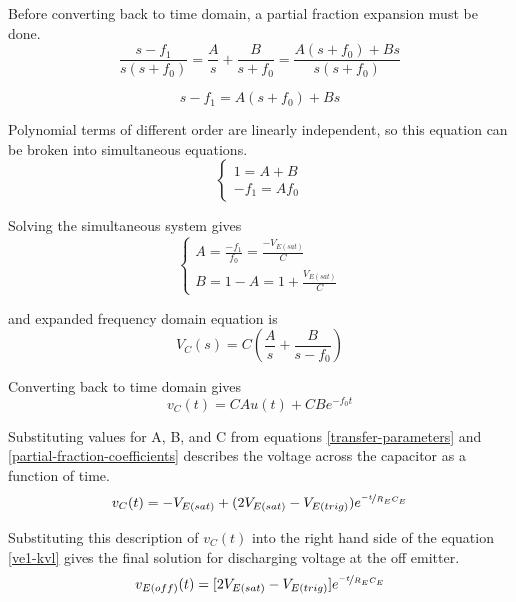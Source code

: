 \documentclass[titlepage, letterpaper, 10.5pt]{article}
\begin{document}
Before converting back to time domain, a partial fraction expansion must be done.
\begin{equation*}
\frac{s-f_{1}}{s(s+f_{0})}=\frac{A}{s}+\frac{B}{s+f_{0}}=\frac{A(s+f_{0})+Bs}{s(s+f_{0})}
\end{equation*}

\begin{equation*}
s-f_{1}=A(s+f_{0})+Bs
\end{equation*}

Polynomial terms of different order are linearly independent, so this equation can be broken
into simultaneous equations.
\begin{equation*}
	\left\{
	\begin{array}{lr}
	1=A+B	\\
	-f_{1}=Af_{0}
	\end{array}
	\right.
\end{equation*}

Solving the simultaneous system gives
\begin{equation}
	\left\{
	\begin{array}{lr}
	A=\frac{-f_{1}}{f_{0}}=\frac{-V_{E(sat)}}{C}	\\
	B=1-A=1+\frac{V_{E(sat)}}{C}
	\end{array}
	\right.
\label{partial-fraction-coefficients}
\end{equation}


and expanded frequency domain equation is
\begin{equation}
V_{C}(s)=C\left(\frac{A}{s}+\frac{B}{s-f_{0}}\right)
\end{equation}

Converting back to time domain gives
\begin{equation*}
v_{C}(t)=CAu(t)+CBe^{-f_{0}t}
\end{equation*}

Substituting values for A, B, and C from equations
\ref{transfer-parameters} and \ref{partial-fraction-coefficients}
describes the voltage across the capacitor as a function of time.
\begin{equation*}
v_{C}(t)=-V_{E(sat)}+(2V_{E(sat)}-V_{E(trig)})e^{\nicefrac{-t}{R_{E}C_{E}}}
\end{equation*}

Substituting this description of $v_{C}(t)$ into the right hand side of
the equation \ref{ve1-kvl} gives the final solution for discharging voltage
at the off emitter.
\begin{equation}
v_{E(off)}(t)=[2V_{E(sat)}-V_{E(trig)}]e^{\nicefrac{-t}{R_{E}C_{E}}}
\end{equation}
\end{document}
